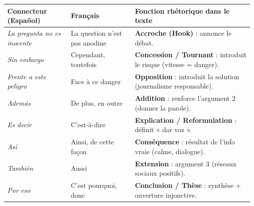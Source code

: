 \documentclass[11pt]{article}
\newcommand{\esp}[1]{\ifmmode\text{\textit{#1}}\else\begingroup\selectlanguage{spanish}\itshape #1\endgroup\fi}
\begin{document}
\begin{propriete}
\begin{center}
\begin{tabularx}{\linewidth}{|X|X|X|}
\hline
\rowcolor{popblueL} \textbf{Connecteur (Español)} & \textbf{Français} & \textbf{Fonction rhétorique dans le texte} \\
\hline
\esp{La pregunta no es inocente} & La question n'est pas anodine & \textbf{Accroche (Hook)} : annonce le débat. \\
\hline
\esp{Sin embargo} & Cependant, toutefois & \textbf{Concession / Tournant} : introduit le risque (vitesse = danger). \\
\hline
\esp{Frente a este peligro} & Face à ce danger & \textbf{Opposition} : introduit la solution (journalisme responsable). \\
\hline
\esp{Además} & De plus, en outre & \textbf{Addition} : renforce l'argument 2 (donner la parole). \\
\hline
\esp{Es decir} & C'est-à-dire & \textbf{Explication / Reformulation} : définit « dar voz ». \\
\hline
\esp{Así} & Ainsi, de cette façon & \textbf{Conséquence} : résultat de l'info vraie (calme, dialogue). \\
\hline
\esp{También} & Aussi & \textbf{Extension} : argument 3 (réseaux sociaux positifs). \\
\hline
\esp{Por eso} & C'est pourquoi, donc & \textbf{Conclusion / Thèse} : synthèse + ouverture injonctive. \\
\hline
\end{tabularx}
\end{center}


\end{propriete}
\end{document}
